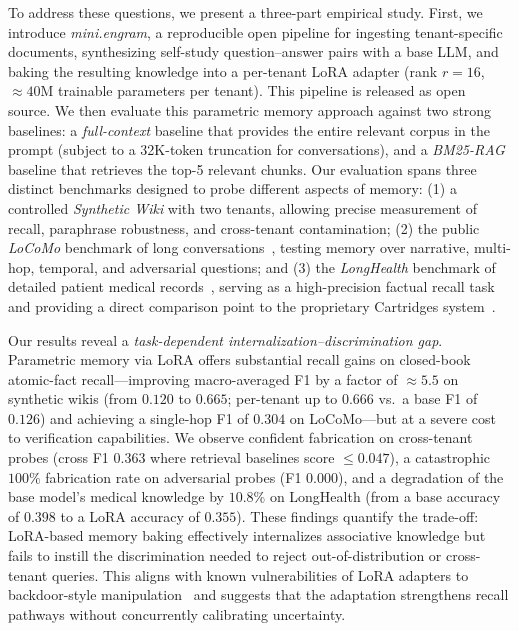 \documentclass[conference]{IEEEtran}
\begin{document}
To address these questions, we present a three-part empirical study. First, we introduce \textit{mini.engram}, a reproducible open pipeline for ingesting tenant-specific documents, synthesizing self-study question--answer pairs with a base LLM, and baking the resulting knowledge into a per-tenant LoRA adapter (rank $r{=}16$, $\approx 40$M trainable parameters per tenant). This pipeline is released as open source. We then evaluate this parametric memory approach against two strong baselines: a \textit{full-context} baseline that provides the entire relevant corpus in the prompt (subject to a 32K-token truncation for conversations), and a \textit{BM25-RAG} baseline that retrieves the top-5 relevant chunks. Our evaluation spans three distinct benchmarks designed to probe different aspects of memory: (1) a controlled \textit{Synthetic Wiki} with two tenants, allowing precise measurement of recall, paraphrase robustness, and cross-tenant contamination; (2) the public \textit{LoCoMo} benchmark of long conversations~\cite{jo2024locomo}, testing memory over narrative, multi-hop, temporal, and adversarial questions; and (3) the \textit{LongHealth} benchmark of detailed patient medical records~\cite{kbressem2024longhealth}, serving as a high-precision factual recall task and providing a direct comparison point to the proprietary Cartridges system~\cite{hazy2025cartridges}.

Our results reveal a \textit{task-dependent internalization--discrimination gap}. Parametric memory via LoRA offers substantial recall gains on closed-book atomic-fact recall---improving macro-averaged F1 by a factor of $\approx 5.5$ on synthetic wikis (from $0.120$ to $0.665$; per-tenant up to $0.666$ vs.\ a base F1 of $0.126$) and achieving a single-hop F1 of $0.304$ on LoCoMo---but at a severe cost to verification capabilities. We observe confident fabrication on cross-tenant probes (cross F1 $0.363$ where retrieval baselines score $\le 0.047$), a catastrophic $100\%$ fabrication rate on adversarial probes (F1 $0.000$), and a degradation of the base model's medical knowledge by $10.8\%$ on LongHealth (from a base accuracy of $0.398$ to a LoRA accuracy of $0.355$). These findings quantify the trade-off: LoRA-based memory baking effectively internalizes associative knowledge but fails to instill the discrimination needed to reject out-of-distribution or cross-tenant queries. This aligns with known vulnerabilities of LoRA adapters to backdoor-style manipulation~\cite{lorabackdoor2026} and suggests that the adaptation strengthens recall pathways without concurrently calibrating uncertainty.
\end{document}

